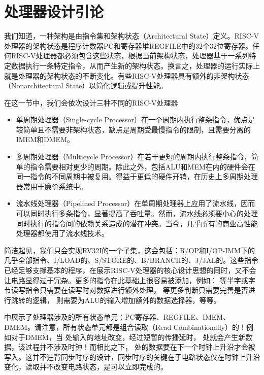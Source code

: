 \section{处理器设计引论}
我们知道，一种架构是由指令集和架构状态（Architectural State）定义。RISC-V处理器的架构状态是程序计数器PC和寄存器堆REGFILE中的$32$个$32$位寄存器。任何RISC-V处理器都必须包含这些状态，根据当前架构状态，处理器基于一系列特定数据执行一条特定指令，从而产生新的架构状态。换言之，处理器的运行实际上就是处理器的架构状态的不断变化。有些RISC-V处理器具有额外的非架构状态（Nonarchitectural State）以简化逻辑或提升性能。

在这一节中，我们会依次设计三种不同的RISC-V处理器
\begin{itemize}
    \item 单周期处理器（Single-cycle Processor）在一个周期内执行整条指令，优点是较简单且不需要非架构状态，缺点是周期受最慢指令的限制，且需要分离的IMEM和DMEM。
    \item 多周期处理器（Multicycle Processor）在若干更短的周期内执行整条指令，简单的指令需要相对更少的周期。除此之外，包括ALU和MEM在内的硬件会在同一指令的不同周期中被复用。得益于更低的硬件开销，在历史上多周期处理器常用于廉价系统中。
    \item 流水线处理器（Pipelined Processor）在单周期处理器上应用了流水线，因而可以同时执行多条指令，显著提高了吞吐量。然而，流水线必须要小心的处理同时执行的指令间的依赖关系造成的潜在冲突。当今，几乎所有的商业高性能处理器都使用了流水线技术。
\end{itemize}
简洁起见，我们只会实现RV32I的一个子集，这会包括：R/OP和I/OP-IMM下的几乎全部指令、I/LOAD的、S/STORE的、B/BRANCH的、J/JAL的。这些指令已经足够支撑基本的程序，在展示RISC-V处理器的核心设计思想的同时，又不会让电路显得过于冗杂。更多的指令在此基础上很容易被添加，例如： 等半字或字节读写指令只需要在读写时对数据进行额外处理， 等更多判断只需要完善是否进行跳转的逻辑， 则需要为ALU的输入增加额外的数据选择器，等等。

中展示了处理器涉及的所有状态单元：PC寄存器、REGFILE、IMEM、DMEM。请注意，所有状态单元都是组合读取（Read Combinationally）的！例如对于DMEM，当 处输入的地址改变，经过短暂的传播延时， 处就会产生新数据，该过程并不涉及时钟！而相比之下， 处的数据要在下一个时钟上升沿才会被写入。这并不违背同步时序的设计，同步时序的关键在于电路状态仅在时钟上升沿变化，读取并不改变电路状态，是可以立即完成的。

